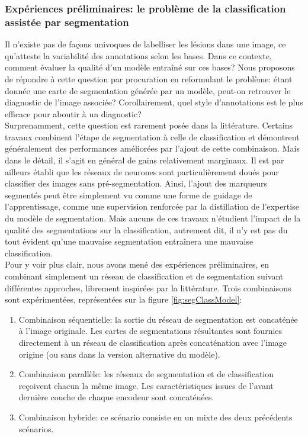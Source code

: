 \subsubsection{Expériences préliminaires: le problème de la classification assistée par segmentation}
\label{sec:preliminaryExperimentClassSegm}
Il n'existe pas de façons univoques de labelliser les lésions dans une image, ce qu'atteste la variabilité des annotations selon les bases. Dans ce contexte, comment évaluer la qualité d'un modèle entraîné sur ces bases? Nous proposons de répondre à cette question par procuration en reformulant le problème:
étant donnée une carte de segmentation générée par un modèle, peut-on retrouver le diagnostic de l'image associée? Corollairement, quel style d'annotations est le plus efficace pour aboutir à un diagnostic? 
\\
Surprenamment, cette question est rarement posée dans la littérature. Certains travaux combinent l'étape de segmentation à celle de classification \cite{liDiagnosticAssessmentDeep2019b, zhouBenchmarkStudyingDiabetic2021, weiLearnSegmentRetinal2021a} et démontrent généralement des performances améliorées par l'ajout de cette combinaison. Mais dans le détail, il s'agit en général de gains relativement marginaux. Il est par ailleurs établi que les réseaux de neurones sont particulièrement doués pour classifier des images sans pré-segmentation. Ainsi, l'ajout des marqueurs segmentés peut être simplement vu comme une forme de guidage de l'apprentissage, comme une supervision renforcée par la distillation de l'expertise du modèle de segmentation. Mais aucuns de ces travaux n'étudient l'impact de la qualité des segmentations sur la classification, autrement dit, il n'y est pas du tout évident qu'une mauvaise segmentation entraînera une mauvaise classification. \\
Pour y voir plus clair, nous avons mené des expériences préliminaires, en combinant simplement un réseau de classification et de segmentation suivant différentes approches, librement inspirées par la littérature. Trois combinaisons sont expérimentées, représentées sur la figure \ref{fig:segClassModel}:
\begin{enumerate}
	\item Combinaison séquentielle: la sortie du réseau de segmentation est concaténée à l'image originale. Les cartes de segmentations résultantes sont fournies directement à un réseau de classification après concaténation avec l'image origine (ou sans dans la version alternative du modèle).
	\item Combinaison parallèle: les réseaux de segmentation et de classification reçoivent chacun la même image. Les caractéristiques issues de l'avant dernière couche de chaque encodeur sont concaténées.
	\item Combinaison hybride: ce scénario consiste en un mixte des deux précédents scénarios.
\end{enumerate}
